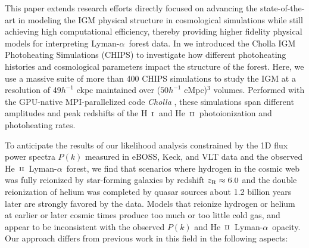 \documentclass[twocolumn]{aastex62}
\newcommand\Lya{Lyman-$\alpha$}
\def\HI{\hbox{\rm H~$\scriptstyle\rm I$}}
\def\HeII{\hbox{He~$\scriptstyle\rm II$}}
\begin{document}
This paper extends research efforts
directly focused on advancing the state-of-the-art in modeling the IGM physical structure in cosmological simulations while still 
achieving high computational efficiency, thereby providing higher fidelity physical models for interpreting \Lya\ forest data. 
In \citet{villasenor2021a} 
we 
introduced
the Cholla IGM Photoheating Simulations (CHIPS) to investigate how different photoheating histories and cosmological parameters impact the 
structure of the forest. Here, we use a massive suite of more than 400 CHIPS simulations to study the IGM at a resolution of 49$h^{-1}$ ckpc maintained 
over ($50h^{-1}$ cMpc)$^3$ volumes. 
Performed
with the GPU-native MPI-parallelized code {\it Cholla} \citep{schneider2015a}, these simulations span different 
amplitudes and peak redshifts of the \HI\ and \HeII\ photoionization and photoheating rates.

To anticipate the results of our likelihood analysis
constrained by the 1D flux power spectra $P(k)$ measured in eBOSS, Keck, and VLT 
data and the observed \HeII\ \Lya\ forest, we find that scenarios where hydrogen in the cosmic web was fully reionized by star-forming galaxies 
by redshift $z_{\rm R}\approx 6.0$
and the double reionization of helium was completed by quasar sources about 1.2 billion years later are strongly favored by the data. 
Models that reionize hydrogen or helium at earlier or later cosmic times produce too much or too little cold gas, and appear to be inconsistent with 
the observed $P(k)$ and \HeII\ \Lya\ opacity. Our approach differs from previous work in this field in the following aspects:
\end{document}
